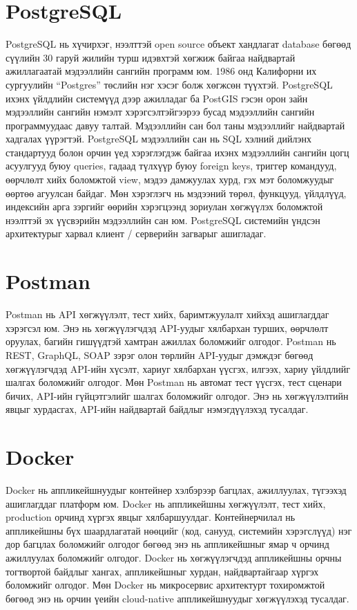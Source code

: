 \section{PostgreSQL}
PostgreSQL нь хүчирхэг, нээлттэй open source объект хандлагат database бөгөөд сүүлийн 30 гаруй жилийн турш идэвхтэй хөгжиж байгаа найдвартай ажиллагаатай мэдээллийн сангийн программ юм. 1986 онд Калифорни их сургуулийн “Postgres” төслийн нэг хэсэг болж хөгжсөн түүхтэй. PostgreSQL ихэнх үйлдлийн системүүд дээр ажилладаг ба PostGIS гэсэн орон зайн мэдээллийн сангийн нэмэлт хэрэгсэлтэйгээрээ бусад мэдээллийн сангийн программуудаас давуу талтай. Мэдээллийн сан бол таны мэдээллийг найдвартай хадгалах үүрэгтэй. PostgreSQL мэдээллийн сан нь SQL хэлний дийлэнх стандартууд болон орчин үед хэрэглэгдэж байгаа ихэнх мэдээллийн сангийн цогц асуулгууд буюу queries, гадаад түлхүүр буюу foreign keys, триггер командууд, өөрчлөлт хийх боломжтой view, мэдээ дамжуулах хурд, гэх мэт боломжуудыг өөртөө агуулсан байдаг. Мөн хэрэглэгч нь мэдээний төрөл, функцууд, үйлдлүүд, индексийн арга зэргийг өөрийн хэрэгцээнд зориулан хөгжүүлэх боломжтой нээлттэй эх үүсвэрийн мэдээллийн сан юм. PostgreSQL системийн үндсэн архитектурыг харвал клиент / серверийн загварыг ашигладаг.

\section{Postman}
Postman нь API хөгжүүлэлт, тест хийх, баримтжуулалт хийхэд ашиглагддаг хэрэгсэл юм. Энэ нь хөгжүүлэгчдэд API-уудыг хялбархан турших, өөрчлөлт оруулах, багийн гишүүдтэй хамтран ажиллах боломжийг олгодог. Postman нь REST, GraphQL, SOAP зэрэг олон төрлийн API-уудыг дэмждэг бөгөөд хөгжүүлэгчдэд API-ийн хүсэлт, хариуг хялбархан үүсгэх, илгээх, хариу үйлдлийг шалгах боломжийг олгодог. Мөн Postman нь автомат тест үүсгэх, тест сценари бичих, API-ийн гүйцэтгэлийг шалгах боломжийг олгодог. Энэ нь хөгжүүлэлтийн явцыг хурдасгах, API-ийн найдвартай байдлыг нэмэгдүүлэхэд тусалдаг.

\section{Docker}
Docker нь аппликейшнуудыг контейнер хэлбэрээр багцлах, ажиллуулах, түгээхэд ашиглагддаг платформ юм. Docker нь аппликейшны хөгжүүлэлт, тест хийх, production орчинд хүргэх явцыг хялбаршуулдаг. Контейнерчилал нь аппликейшны бүх шаардлагатай нөөцийг (код, санууд, системийн хэрэгслүүд) нэг дор багцлах боломжийг олгодог бөгөөд энэ нь аппликейшныг ямар ч орчинд ажиллуулах боломжийг олгодог. Docker нь хөгжүүлэгчдэд аппликейшны орчны тогтвортой байдлыг хангах, аппликейшныг хурдан, найдвартайгаар хүргэх боломжийг олгодог. Мөн Docker нь микросервис архитектурт тохиромжтой бөгөөд энэ нь орчин үеийн cloud-native аппликейшнуудыг хөгжүүлэхэд тусалдаг.